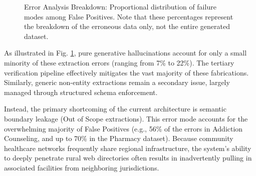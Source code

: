 \documentclass[12pt,oneside]{report}
\begin{document}
\begin{figure}[htbp]
\centering
\pgfplotsset{compat=1.18}
\caption{Error Analysis Breakdown: Proportional distribution of failure modes among False Positives. Note that these percentages represent the breakdown of the erroneous data only, not the entire generated dataset.}
\label{fig:error_breakdown}
\end{figure}

As illustrated in Fig. \ref{fig:error_breakdown}, pure generative hallucinations account for only a small minority of these extraction errors (ranging from 7\% to 22\%). The tertiary verification pipeline effectively mitigates the vast majority of these fabrications. Similarly, generic non-entity extractions remain a secondary issue, largely managed through structured schema enforcement. 

Instead, the primary shortcoming of the current architecture is semantic boundary leakage (Out of Scope extractions). This error mode accounts for the overwhelming majority of False Positives (e.g., 56\% of the errors in Addiction Counseling, and up to 70\% in the Pharmacy dataset). Because community healthcare networks frequently share regional infrastructure, the system's ability to deeply penetrate rural web directories often results in inadvertently pulling in associated facilities from neighboring jurisdictions.
\end{document}
